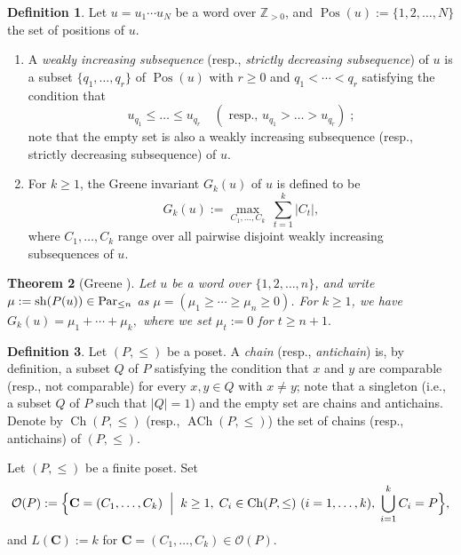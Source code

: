 \documentclass[reqno]{amsart}
\newtheorem{theorem}{Theorem}[section]
\theoremstyle{definition}
\newtheorem{definition}[theorem]{Definition}
\theoremstyle{remark}
\numberwithin{equation}{section}
\newcommand{\shape}{\operatorname{sh}}
\begin{document}
	\newcommand{\Pos}{\operatorname{Pos}}
	
	\begin{definition}\label{def:greene-inv.}
		Let $u=u_1\cdots u_N$ be a word over $\mathbb{Z}_{>0}$,
		and $\Pos(u):=\{1,2,\dots,N\}$ the set of positions of $u$.
		\begin{enumerate}
			\item[(i)] A \emph{weakly increasing subsequence} (resp., \emph{strictly decreasing subsequence}) of $u$ is a subset
			$\{q_1,\dots,q_r\}$ of $\Pos(u)$ with $r\ge0$ and $q_1<\cdots<q_r$ satisfying the condition that 
			$$u_{q_1}\le\dots\le u_{q_r}\quad
			(\text{ resp., }u_{q_1}>\dots> u_{q_r})\;;
			$$
			note that the empty set is also a weakly increasing subsequence (resp., strictly decreasing subsequence) of $u$.
			\item[(ii)]
			For $k\ge1$, 
			the Greene invariant $G_k(u)$ of $u$ is defined to be
			\[
			G_k(u):=\max_{C_1,\dots,C_k}\ \sum_{t=1}^k|C_t|,
			\]
			where $C_1,\dots,C_k$ range over all pairwise disjoint weakly increasing subsequences of $u$. 
		\end{enumerate}
	\end{definition}
	
	\begin{theorem}[Greene {\cite{greene1974}}]\label{thm:greene}
		Let $u$ be a word over $\{1,2,\dots,n\}$, and write $\mu:=\shape(P(u))\in\Par_{\le n}$ as $\mu=(\mu_1\ge\cdots\ge \mu_n\ge 0)$.
		For $k\ge1$, we have
		$G_k(u)=\mu_1+\cdots+\mu_k,$
		where we set $\mu_t:=0$ for $t\ge n+1.$
	\end{theorem}
	
	\newcommand{\Ch}{\operatorname{Ch}}
	\newcommand{\ACh}{\operatorname{ACh}}
	
	\begin{definition}
		Let $(P,\le)$ be a poset.
		A \emph{chain} (resp., \emph{antichain}) is, by definition, a subset $Q$ of $P$ satisfying the condition that $x$ and $y$ are comparable (resp., not comparable) for every $x,y \in Q$ with $x\ne y$;
		note that a singleton (i.e., a subset $Q$ of $P$ such that $|Q|=1$) and the empty set are chains and antichains.
		Denote by $\Ch(P,\le)$ (resp., $\ACh(P,\le)$) the set of chains (resp., antichains) of $(P,\le)$.
		
	\end{definition}
	
	Let $(P,\le)$ be a finite poset.
	Set
	$$\mathcal{O}(P):=\Bigl\{\mathbf{C}=(C_1,\dots,C_k)\;\Bigm|\;k\ge1,\;C_i\in\Ch(P,\le)\ (i=1,\dots,k),\;\bigcup_{i=1}^k C_i=P\Bigr\},$$
	and $L(\mathbf{C}):=k$ for $\mathbf{C}=(C_1,\dots,C_k)\in \mathcal{O}(P)$.
	
\end{document}
